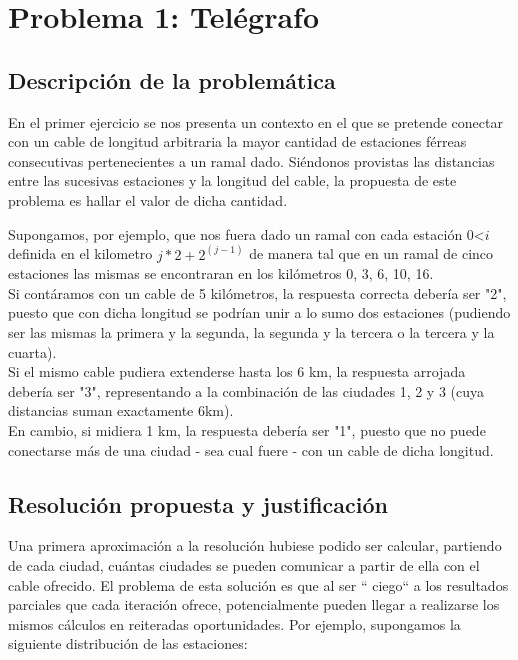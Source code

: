 \section{Problema 1: Tel\'egrafo}

\subsection{Descripci\'on de la problem\'atica}

En el primer ejercicio se nos presenta un contexto en el que se pretende conectar con un cable de longitud arbitraria la mayor cantidad de estaciones férreas consecutivas pertenecientes a un ramal dado. 
Siéndonos provistas las distancias entre las sucesivas estaciones y la longitud del cable, la propuesta de este problema es hallar el valor de dicha cantidad.

Supongamos, por ejemplo, que nos fuera dado un ramal con cada estación  0<$i$ definida en el kilometro $j*2+2^(j-1)$ de manera tal que en un ramal de cinco estaciones las mismas se encontraran en los kilómetros 0, 3, 6, 10, 16. \\

Si contáramos con un cable de 5 kilómetros, la respuesta correcta debería ser "2", puesto que con dicha longitud se podrían unir a lo sumo dos estaciones (pudiendo ser las mismas la primera y la segunda, la segunda y la tercera o la tercera y la cuarta).\\

Si el mismo cable pudiera extenderse hasta los 6 km, la respuesta arrojada debería ser "3", representando a la combinación de las ciudades 1, 2 y 3 (cuya distancias suman exactamente 6km).\\

En cambio, si midiera 1 km, la respuesta debería ser "1", puesto que no puede conectarse más de una ciudad - sea cual fuere - con un cable de dicha longitud.\\

\subsection{Resoluci\'on propuesta y justificaci\'on}
Una primera aproximación a la resolución hubiese podido ser calcular, partiendo de cada ciudad, cuántas ciudades se pueden comunicar a partir de ella con el cable ofrecido. El problema de esta solución es que al ser `` ciego`` a los resultados parciales que cada iteración ofrece, potencialmente pueden llegar a realizarse los mismos cálculos en reiteradas oportunidades.
Por ejemplo, supongamos la siguiente distribución de las estaciones:

